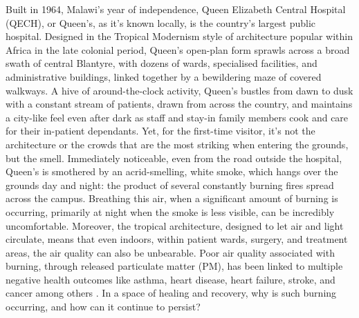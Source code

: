 \documentclass[
  authoryear,
  review,
  3p]{elsarticle}
\begin{document}
Built in 1964, Malawi's year of independence, Queen Elizabeth Central
Hospital (QECH), or Queen's, as it's known locally, is the country's
largest public hospital. Designed in the Tropical Modernism style of
architecture popular within Africa in the late colonial period, Queen's
open-plan form sprawls across a broad swath of central Blantyre, with
dozens of wards, specialised facilities, and administrative buildings,
linked together by a bewildering maze of covered walkways. A hive of
around-the-clock activity, Queen's bustles from dawn to dusk with a
constant stream of patients, drawn from across the country, and
maintains a city-like feel even after dark as staff and stay-in family
members cook and care for their in-patient dependants. Yet, for the
first-time visitor, it's not the architecture or the crowds that are the
most striking when entering the grounds, but the smell. Immediately
noticeable, even from the road outside the hospital, Queen's is
smothered by an acrid-smelling, white smoke, which hangs over the
grounds day and night: the product of several constantly burning fires
spread across the campus. Breathing this air, when a significant amount
of burning is occurring, primarily at night when the smoke is less
visible, can be incredibly uncomfortable. Moreover, the tropical
architecture, designed to let air and light circulate, means that even
indoors, within patient wards, surgery, and treatment areas, the air
quality can also be unbearable. Poor air quality associated with
burning, through released particulate matter (PM), has been linked to
multiple negative health outcomes like asthma, heart disease, heart
failure, stroke, and cancer among others
\citep{anderson2012clearing, bell2012assessment}. In a space of healing
and recovery, why is such burning occurring, and how can it continue to
persist?
\end{document}
